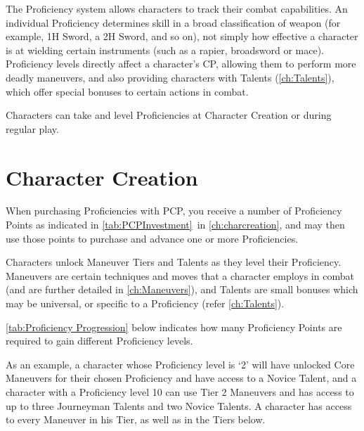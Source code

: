 \documentclass[oneside,11pt,english]{book}
\begin{document}
The Proficiency system allows characters to track their combat capabilities. An
individual Proficiency determines skill in a broad classification of weapon (for
example, 1H Sword, a 2H Sword, and so on), not simply how effective a character
is at wielding certain instruments (such as a rapier, broadsword or mace).
Proficiency levels directly affect a character’s CP, allowing them to perform
more deadly maneuvers, and also providing characters with Talents
(\autoref{ch:Talents}), which offer special bonuses to certain actions in
combat. 

Characters can take and level Proficiencies at Character Creation or during
regular play. 

\section{Character Creation}
When purchasing Proficiencies with PCP, you receive a number of Proficiency
Points as indicated in \autoref{tab:PCPInvestment}~in \autoref{ch:charcreation},
and may then use those points to purchase and advance one or more Proficiencies. 

Characters unlock Maneuver Tiers and Talents as they level their Proficiency.
Maneuvers are certain techniques and moves that a character employs in combat
(and are further detailed in \autoref{ch:Maneuvers}), and Talents are small
bonuses which may be universal, or specific to a Proficiency (refer \autoref{ch:Talents}).  

\autoref{tab:Proficiency Progression} below indicates how many Proficiency
Points are required to gain different Proficiency levels.  

As an example, a character whose Proficiency level is ‘2’ will have unlocked
Core Maneuvers for their chosen Proficiency and have access to a Novice Talent,
and a character with a Proficiency level 10 can use Tier 2 Maneuvers and has
access to up to three Journeyman Talents and two Novice Talents. A character has
access to every Maneuver in his Tier, as well as in the Tiers below.  
\end{document}
